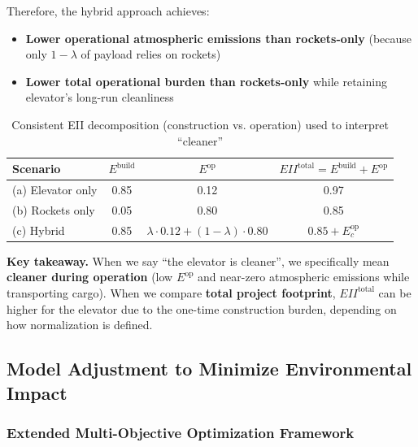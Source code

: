 \documentclass{mcmthesis}
\begin{document}
Therefore, the hybrid approach achieves:
\begin{itemize}
    \item \textbf{Lower operational atmospheric emissions than rockets-only} (because only $1-\lambda$ of payload relies on rockets)
    \item \textbf{Lower total operational burden than rockets-only} while retaining elevator's long-run cleanliness
\end{itemize}

\begin{table}[H]
    \centering
    \caption{Consistent EII decomposition (construction vs. operation) used to interpret ``cleaner''}
    \label{tab:eii_decomposition}
    \begin{tabular}{lccc}
        \toprule
        \textbf{Scenario} & $E^{\text{build}}$ & $E^{\text{op}}$                           & $EII^{\text{total}}=E^{\text{build}}+E^{\text{op}}$ \\
        \midrule
        (a) Elevator only & 0.85               & 0.12                                      & 0.97                                                \\
        (b) Rockets only  & 0.05               & 0.80                                      & 0.85                                                \\
        (c) Hybrid        & 0.85               & $\lambda\cdot 0.12+(1-\lambda)\cdot 0.80$ & $0.85+E_c^{\text{op}}$                              \\
        \bottomrule
    \end{tabular}
\end{table}

\noindent\textbf{Key takeaway.}
When we say ``the elevator is cleaner'', we specifically mean \textbf{cleaner during operation} (low $E^{\text{op}}$ and near-zero atmospheric emissions while transporting cargo). When we compare \textbf{total project footprint}, $EII^{\text{total}}$ can be higher for the elevator due to the one-time construction burden, depending on how normalization is defined.

\subsection{Model Adjustment to Minimize Environmental Impact}

\subsubsection{Extended Multi-Objective Optimization Framework}
\end{document}

